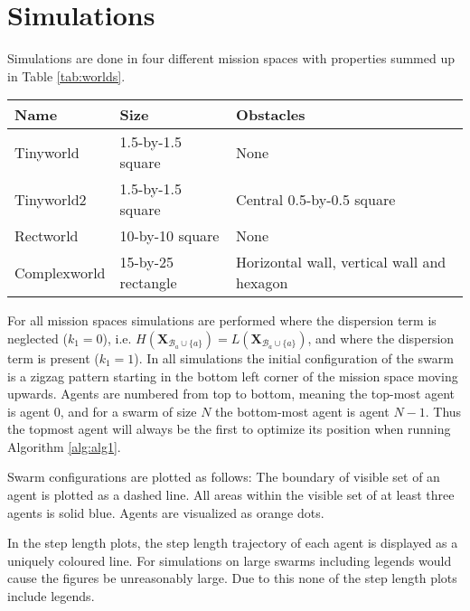 \section{Simulations}\label{sec:results}
Simulations are done in four different mission spaces with properties summed up in Table \ref{tab:worlds}.
\begin{center}
  \begin{tabular}{l|l|l}
    Name & Size & Obstacles\\
    \hline
    Tinyworld & 1.5-by-1.5 square & None\\
    Tinyworld2 & 1.5-by-1.5 square & Central 0.5-by-0.5 square\\
    Rectworld & 10-by-10 square & None\\
    Complexworld & 15-by-25 rectangle & Horizontal wall, vertical wall and hexagon
  \end{tabular}
\end{center}
For all mission spaces simulations are performed where the dispersion term is neglected ($k_{1} = 0$), i.e.
$H(\mathbf{X}_{\mathcal{B}_{a}\cup\{a\}}) = L(\mathbf{X}_{\mathcal{B}_{a}\cup\{a\}})$, and where the dispersion term
is present ($k_{1} = 1$). In all simulations the initial configuration of the swarm is a zigzag pattern starting in the bottom
left corner of the mission space moving upwards. Agents are numbered from top to bottom, meaning the top-most agent is agent $0$, and for 
a swarm of size $N$ the bottom-most agent is agent $N-1$. Thus the topmost agent will always be the first to optimize its position
when running Algorithm \ref{alg:alg1}.

Swarm configurations are plotted as follows: The boundary of visible set of an agent is plotted as a dashed line. All areas within the visible set 
of at least three agents is solid blue. Agents are visualized as orange dots.

In the step length plots, the step length trajectory of each agent is displayed as a uniquely coloured line. For simulations on large swarms
including legends would cause the figures be unreasonably large. Due to this none of the step length plots include legends.
\clearpage

\clearpage

\clearpage

\clearpage
